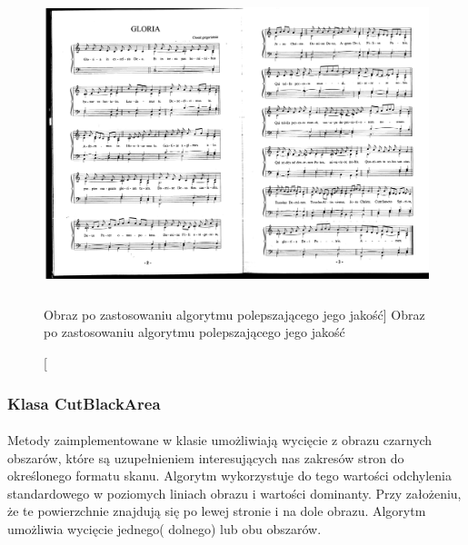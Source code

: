 \documentclass[a4paper,12pt]{article}
\begin{document}
		        \begin{figure}[!ht]  
    			    \begin{center}
    				    \includegraphics[height=8.5cm, frame] {image//exampleImage//001_b.png} 
    			    \end{center}
	    		    \caption
    			        [Obraz po zastosowaniu algorytmu polepszającego jego jakość]  
	    		        {Obraz po zastosowaniu algorytmu polepszającego jego jakość}  
	            \end{figure}
		
		\subsubsection{Klasa CutBlackArea}
			\paragraph{} Metody zaimplementowane w klasie umożliwiają wycięcie z obrazu     czarnych obszarów, które są uzupe\l nieniem interesujących nas zakresów     stron do określonego formatu skanu. Algorytm wykorzystuje do tego           wartości odchylenia standardowego w poziomych liniach obrazu i wartości     dominanty. Przy założeniu, że te powierzchnie znajdują się po lewej         stronie i na dole obrazu. Algorytm umożliwia wycięcie jednego( dolnego)     lub obu obszarów. 
			
\end{document}
